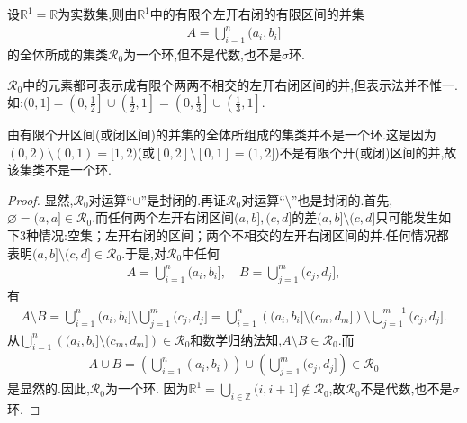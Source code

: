 \documentclass[../../main.tex]{subfiles}%
\begin{document}
\begin{example}\label{example::--23r8u3r89uj2jr3}
设$\mathbb{R}^1 = \mathbb{R}$为实数集,则由$\mathbb{R}^1$中的有限个左开右闭的有限区间的并集
\begin{align*}
A = \bigcup_{i=1}^{n} (a_i, b_i]
\end{align*}
的全体所成的集类$\mathscr{R}_0$为一个环,但不是代数,也不是$\sigma$环.
\end{example}
\begin{remark}
$\mathscr{R}_0$中的元素都可表示成有限个两两不相交的左开右闭区间的并,但表示法并不惟一.如:$(0,1] = \left(0, \frac{1}{2}\right] \cup \left( \frac{1}{2}, 1 \right] = \left(0, \frac{1}{3}\right] \cup \left( \frac{1}{3}, 1 \right].$
\end{remark}
\begin{remark}
由有限个开区间(或闭区间)的并集的全体所组成的集类并不是一个环.这是因为$(0,2) \setminus (0,1) = [1,2)$(或$[0,2] \setminus [0,1] = (1,2]$)不是有限个开(或闭)区间的并,故该集类不是一个环.
\end{remark}
\begin{proof}

显然,$\mathscr{R}_0$对运算“$\cup$”是封闭的.再证$\mathscr{R}_0$对运算“$\setminus$”也是封闭的.首先,$\varnothing = (a, a] \in \mathscr{R}_0$.而任何两个左开右闭区间$(a,b],(c,d]$的差$(a,b] \setminus (c,d]$只可能发生如下3种情况:\one 空集；\two 左开右闭的区间；\three 两个不相交的左开右闭区间的并.任何情况都表明$(a,b] \setminus (c,d] \in \mathscr{R}_0$.于是,对$\mathscr{R}_0$中任何
\begin{align*}
A = \bigcup_{i=1}^{n} (a_i, b_i], \quad B = \bigcup_{j=1}^{m} (c_j, d_j],
\end{align*}
有
\begin{align*}
A \setminus B = \bigcup_{i=1}^{n} (a_i, b_i] \setminus \bigcup_{j=1}^{m} (c_j, d_j] = \bigcup_{i=1}^{n} \left( (a_i, b_i] \setminus (c_m, d_m] \right) \setminus \bigcup_{j=1}^{m-1} (c_j, d_j].
\end{align*}
从$\bigcup_{i=1}^{n} \left( (a_i, b_i] \setminus (c_m, d_m] \right) \in \mathscr{R}_0$和数学归纳法知,$A \setminus B \in \mathscr{R}_0$.而
\begin{align*}
A \cup B = \left( \bigcup_{i=1}^{n} (a_i, b_i) \right) \cup \left( \bigcup_{j=1}^{m} (c_j, d_j] \right) \in \mathscr{R}_0
\end{align*}
是显然的.因此,$\mathscr{R}_0$为一个环.
因为$\mathbb{R}^1 = \bigcup_{i \in \mathbb{Z}} (i, i+1] \notin \mathscr{R}_0$,故$\mathscr{R}_0$不是代数,也不是$\sigma$环.

\end{proof}
\end{document}
